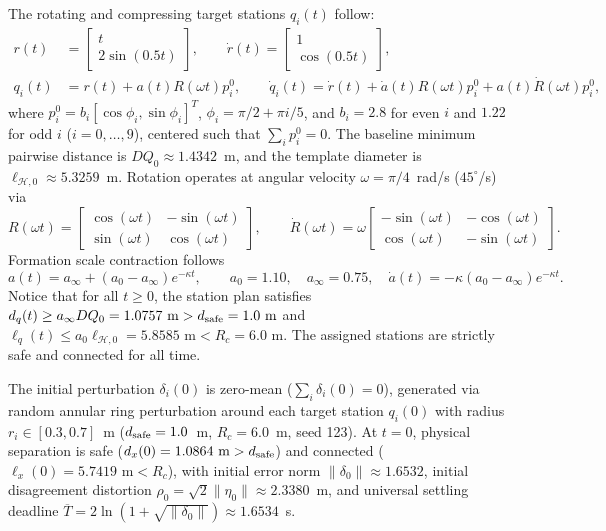 \documentclass[10pt]{article}
\begin{document}
The rotating and compressing target stations $q_i(t)$ follow:
\begin{align*}
r(t) &= \begin{bmatrix} t \\ 2 \sin(0.5 t) \end{bmatrix}, \qquad
\dot r(t) = \begin{bmatrix} 1 \\ \cos(0.5 t) \end{bmatrix}, \\
q_i(t) &= r(t) + a(t) R(\omega t) p_i^0, \qquad
\dot q_i(t) = \dot r(t) + \dot a(t) R(\omega t) p_i^0 + a(t) \dot R(\omega t) p_i^0,
\end{align*}
where $p_i^0 = b_i [\cos\phi_i, \sin\phi_i]^T$, $\phi_i = \pi/2 + \pi i/5$, and $b_i = 2.8$ for even $i$ and $1.22$ for odd $i$ ($i=0,\ldots,9$), centered such that $\sum_i p_i^0 = 0$. The baseline minimum pairwise distance is $DQ_0 \approx 1.4342$~m, and the template diameter is $\ell_{\mathcal{H},0} \approx 5.3259$~m.
Rotation operates at angular velocity $\omega = \pi/4$~rad/s ($45^\circ$/s) via
\[
R(\omega t) = \begin{bmatrix} \cos(\omega t) & -\sin(\omega t) \\ \sin(\omega t) & \cos(\omega t) \end{bmatrix}, \qquad
\dot R(\omega t) = \omega \begin{bmatrix} -\sin(\omega t) & -\cos(\omega t) \\ \cos(\omega t) & -\sin(\omega t) \end{bmatrix}.
\]
Formation scale contraction follows
\[
a(t) = a_\infty + (a_0 - a_\infty)e^{-\kappa t}, \qquad a_0 = 1.10, \quad a_\infty = 0.75, \quad \dot a(t) = -\kappa(a_0 - a_\infty)e^{-\kappa t}.
\]
Notice that for all $t \ge 0$, the station plan satisfies $d_q(t) \ge a_\infty DQ_0 = 1.0757\text{ m} > d_{\rm safe} = 1.0\text{ m}$ and $\ell_q(t) \le a_0 \ell_{\mathcal{H},0} = 5.8585\text{ m} < R_c = 6.0\text{ m}$. The assigned stations are strictly safe and connected for all time.

The initial perturbation $\delta_i(0)$ is zero-mean ($\sum_i \delta_i(0)=0$), generated via random annular ring perturbation around each target station $q_i(0)$ with radius $r_i \in [0.3, 0.7]$~m ($d_{\rm safe} = 1.0$~m, $R_c = 6.0$~m, seed 123). At $t=0$, physical separation is safe ($d_x(0) = 1.0864\text{ m} > d_{\rm safe}$) and connected ($\ell_x(0) = 5.7419\text{ m} < R_c$), with initial error norm $\|\delta_0\| \approx 1.6532$, initial disagreement distortion $\rho_0 = \sqrt{2}\|\eta_0\| \approx 2.3380$~m, and universal settling deadline $\overline T = 2\ln(1+\sqrt{\|\delta_0\|}) \approx 1.6534$~s.
\end{document}
